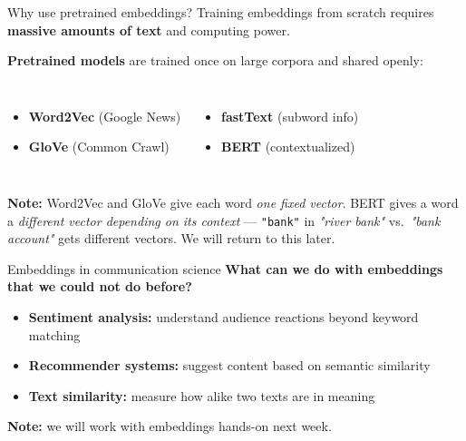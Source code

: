\documentclass[handout]{beamer}
\begin{document}
\begin{frame}{Why use pretrained embeddings?}
    Training embeddings from scratch requires \textbf{massive amounts of text} and computing power.

    \vspace{0.5em}
    \textbf{Pretrained models} are trained once on large corpora and shared openly:

    \vspace{0.5em}
    \begin{columns}
        \begin{itemize}
            \item \textbf{Word2Vec} (Google News)
            \item \textbf{GloVe} (Common Crawl)
        \end{itemize}
        \begin{itemize}
            \item \textbf{fastText} (subword info)
            \item \textbf{BERT} (contextualized)
        \end{itemize}
    \end{columns}

    \vspace{0.5em}
    \small \textbf{Note:} Word2Vec and GloVe give each word \emph{one fixed vector}. BERT gives a word a \emph{different vector depending on its context} --- \texttt{"bank"} in \emph{"river bank"} vs.\ \emph{"bank account"} gets different vectors. We will return to this later.
\end{frame}

\begin{frame}{Embeddings in communication science}
    \textbf{What can we do with embeddings that we could not do before?}
    \begin{itemize}
        \item \textbf{Sentiment analysis:} understand audience reactions beyond keyword matching
        \item \textbf{Recommender systems:} suggest content based on semantic similarity 
        \item \textbf{Text similarity:} measure how alike two texts are in meaning
    \end{itemize}

    \vspace{0.3em}
    \textbf{Note:} we will work with embeddings hands-on next week.
\end{frame}
\end{document}

